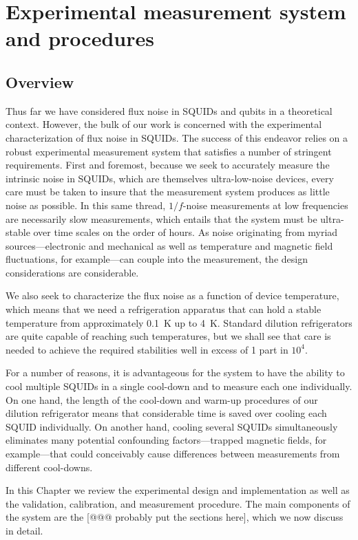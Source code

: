 \chapter{Experimental measurement system and procedures}
\label{chap.experimental}

\section{Overview}

Thus far we have considered flux noise in SQUIDs and qubits in a theoretical context. However, the bulk of our work is concerned with the experimental characterization of flux noise in SQUIDs. The success of this endeavor relies on a robust experimental measurement system that satisfies a number of stringent requirements. First and foremost, because we seek to accurately measure the intrinsic noise in SQUIDs, which are themselves ultra-low-noise devices, every care must be taken to insure that the measurement system produces as little noise as possible. In this same thread, $1/f$-noise measurements at low frequencies are necessarily slow measurements, which entails that the system must be ultra-stable over time scales on the order of hours. As noise originating from myriad sources---electronic and mechanical as well as temperature and magnetic field fluctuations, for example---can couple into the measurement, the design considerations are considerable.

We also seek to characterize the flux noise as a function of device temperature, which means that we need a refrigeration apparatus that can hold a stable temperature from approximately 0.1~K up to 4~K. Standard dilution refrigerators are quite capable of reaching such temperatures, but we shall see that care is needed to achieve the required stabilities well in excess of 1 part in $10^4$.

For a number of reasons, it is advantageous for the system to have the ability to cool multiple SQUIDs in a single cool-down and to measure each one individually. On one hand, the length of the cool-down and warm-up procedures of our dilution refrigerator means that considerable time is saved over cooling each SQUID individually. On another hand, cooling several SQUIDs simultaneously eliminates many potential confounding factors---trapped magnetic fields, for example---that could conceivably cause differences between measurements from different cool-downs.

In this Chapter we review the experimental design and implementation as well as the validation, calibration, and measurement procedure. The main components of the system are the [@@@ probably put the sections here], which we now discuss in detail.

